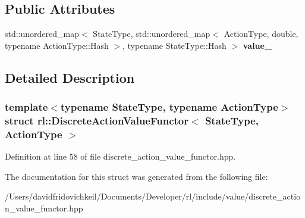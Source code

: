 \subsection*{Public Attributes}
\begin{DoxyCompactItemize}
\item 
\hypertarget{structrl_1_1_discrete_action_value_functor_aeb9044d42d523c3e068254555c84aa22}{}\label{structrl_1_1_discrete_action_value_functor_aeb9044d42d523c3e068254555c84aa22} 
std\+::unordered\+\_\+map$<$ State\+Type, std\+::unordered\+\_\+map$<$ Action\+Type, double, typename Action\+Type\+::\+Hash $>$, typename State\+Type\+::\+Hash $>$ {\bfseries value\+\_\+}
\end{DoxyCompactItemize}


\subsection{Detailed Description}
\subsubsection*{template$<$typename State\+Type, typename Action\+Type$>$\newline
struct rl\+::\+Discrete\+Action\+Value\+Functor$<$ State\+Type, Action\+Type $>$}



Definition at line 58 of file discrete\+\_\+action\+\_\+value\+\_\+functor.\+hpp.



The documentation for this struct was generated from the following file\+:\begin{DoxyCompactItemize}
\item 
/\+Users/davidfridovichkeil/\+Documents/\+Developer/rl/include/value/discrete\+\_\+action\+\_\+value\+\_\+functor.\+hpp\end{DoxyCompactItemize}
